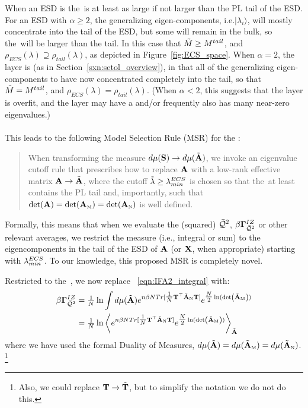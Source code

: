 When an ESD is \emph{\FatTailed} the~\ECS is at least as large if not larger than the PL tail of the ESD.
For an ESD with $\alpha\ge 2$, the generalizing eigen-components, i.e.$|\lambda_{i}\rangle$, will mostly
concentrate into the tail of the ESD, but some will remain in the bulk, so
the~\ECS will be larger than the tail.
In this case that $\tilde{M}\ge M^{tail}$,
and
$\rho_{ECS}(\lambda)\supseteq\rho_{tail}(\lambda)$, as depicted in Figure~\ref{fig:ECS_space}.
When $\alpha=2$,  the layer is \Ideal (as in Section~\ref{sxn:setol_overview}),
in that all of the generalizing eigen-components to have now concentrated completely into the tail, so that
 $\tilde{M}=M^{tail}$,
and
$\rho_{ECS}(\lambda)=\rho_{tail}(\lambda)$.
(When $\alpha< 2$, this suggests that the layer is overfit, and the layer may have a \CorrelationTrap and/or
frequently also has many near-zero eigenvalues.)
\\
\\
This leads to the following Model Selection Rule (MSR) for the \ECS:
\begin{quote}
  When transforming the measure $d\mu({\mathbf{S}}) \rightarrow d\mu(\tilde{\mathbf{A}})$, we invoke an eigenvalue cutoff rule that
  prescribes how to replace $\mathbf{A}$ with a low-rank effective matrix $\mathbf{A}\rightarrow\tilde{\mathbf{A}}$,
  where the cutoff $\tilde{\lambda}\ge\lambda^{ECS}_{min}$ is chosen so that the~\ECS at least contains the PL tail
  and, importantly, such that $\det(\mathbf{A})=\det({\mathbf{A}}_{\text{\tiny M}})=\det({\mathbf{A}}_{\text{\tiny N}})$ is well defined.  
\end{quote}
Formally, this means that when we evaluate the \Quality (squared) $\bar{\mathcal{Q}}^{2}$, \GeneratingFunction $\beta\mathbf{\Gamma}^{IZ}_{\bar{\mathcal{Q}}^{2}}$
or other relevant averages, we restrict the measure (i.e., integral or sum) to the eigencomponents in the tail of the ESD of
$\mathbf{A}$ (or $\mathbf{X}$, when appropriate)
starting with $\lambda^{ECS}_{min}$.  
To our knowledge, this proposed MSR is completely novel.%

Restricted to the~\ECS, we now replace \EQN~\ref{eqn:IFA2_integral} with:
\begin{align}
  \nonumber 
  \beta\mathbf{\Gamma}^{IZ}_{\bar{\mathcal{Q}}^{2}} 
  &=
    \tfrac{1}{N}
  \ln \int d\mu(\tilde{\mathbf{A}})
  e^{n\beta N Tr[\tfrac{1}{N}{\mathbf{T}}^{\top}\tilde{\mathbf{A}}_{\text{\tiny N}}{\mathbf{T}}] }
  e^{\tfrac{N}{2}\ln(\mbox{}{\text{det}}\left(\tilde{\mathbf{A}}_{\text{\tiny M}}\right))} \\
  \label{eqn:IFA2_braket}
  & =
    \tfrac{1}{N}
  \ln
  \left\langle
  e^{n\beta N Tr[\tfrac{1}{N}{\mathbf{T}}^{\top}\tilde{\mathbf{A}}_{\text{\tiny N}}{\mathbf{T}}] }
  e^{\tfrac{N}{2}\ln(\mbox{}{\text{det}}\left(\tilde{\mathbf{A}}_{\text{\tiny M}}\right))}
    \right\rangle_{\tilde{\mathbf{A}}}
\end{align}
where we have used the formal Duality of Measures, $d\mu(\tilde{\mathbf{A}})=d\mu(\tilde{\mathbf{A}}_{\text{\tiny M}})=d\mu(\tilde{\mathbf{A}}_{\text{\tiny N}})$.
\footnote{Also, we could replace ${\mathbf{T}}\rightarrow\tilde{\mathbf{T}}$, but to simplify the notation we do not do this.}

